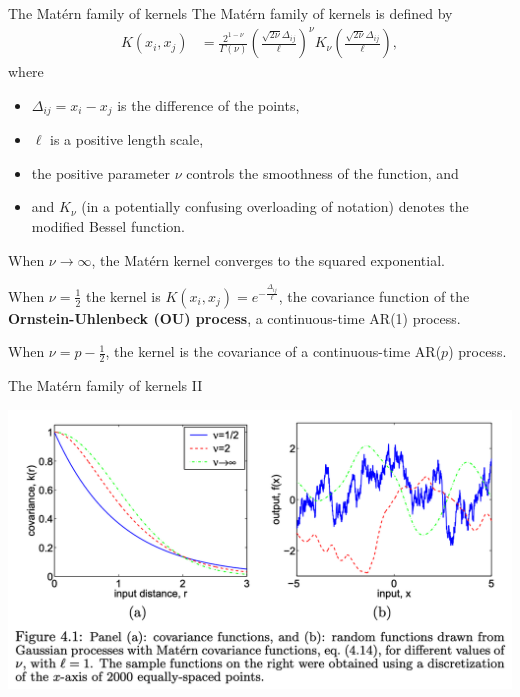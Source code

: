 \documentclass[aspectratio=169]{beamer}
\begin{document}
\begin{frame}{The Mat\'{e}rn family of kernels}
The Mat\'{e}rn family of kernels is defined by
\begin{align}
    K(x_i, x_j) &= \frac{2^{1-\nu}}{\Gamma(\nu)} \left(\frac{\sqrt{2\nu} \Delta_{ij}}{\ell} \right)^\nu K_\nu \left(\frac{\sqrt{2\nu} \Delta_{ij}}{\ell} \right),
\end{align}
where 
\begin{itemize}
    \item $\Delta_{ij} = x_i - x_j$ is the difference of the points,
    \item $\ell$ is a positive length scale,
    \item the positive parameter $\nu$ controls the smoothness of the function, and 
    \item and $K_\nu$ (in a potentially confusing overloading of notation) denotes the modified Bessel function.
\end{itemize}

When $\nu \to \infty$, the Mat\'{e}rn kernel converges to the squared exponential.

When $\nu = \tfrac{1}{2}$ the kernel is $K(x_i, x_j) = e^{-\frac{\Delta_{ij}}{\ell}}$, the covariance function of the \textbf{Ornstein-Uhlenbeck (OU) process}, a continuous-time AR(1) process.

When $\nu = p - \tfrac{1}{2}$, the kernel is the covariance of a continuous-time AR($p$) process.
\end{frame}

\begin{frame}{The Mat\'{e}rn family of kernels II}
\begin{center}
    \includegraphics[width=.8\textwidth]{figures/lap8/matern.png}
\end{center}
\end{frame}
\end{document}
